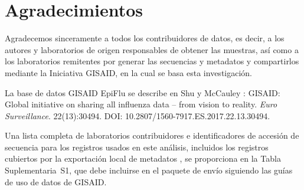 \documentclass[11pt]{article}
\begin{document}
\section*{Agradecimientos}

Agradecemos sinceramente a todos los contribuidores de datos, es decir, a los autores y laboratorios de origen responsables de obtener las muestras, así como a los laboratorios remitentes por generar las secuencias y metadatos y compartirlos mediante la Iniciativa GISAID, en la cual se basa esta investigación.

La base de datos GISAID EpiFlu se describe en Shu y McCauley \cite{shu2017gisaid}: GISAID: Global initiative on sharing all influenza data -- from vision to reality. \emph{Euro Surveillance}. 22(13):30494. DOI: 10.2807/1560-7917.ES.2017.22.13.30494.

Una lista completa de laboratorios contribuidores e identificadores de accesión de secuencia para los registros usados en este análisis, incluidos los registros cubiertos por la exportación local de metadatos , se proporciona en la Tabla Suplementaria~S1, que debe incluirse en el paquete de envío siguiendo las guías de uso de datos de GISAID.



\end{document}
